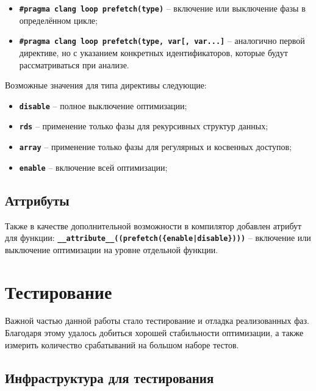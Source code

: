 \documentclass[12pt,a4paper,oneside]{article}
\begin{document}
\begin{itemize}
\item \texttt{\textbf{\#pragma clang loop prefetch(type)}} -- включение или выключение фазы в определённом цикле;
\item \texttt{\textbf{\#pragma clang loop prefetch(type, var[, var...]}} -- аналогично первой директиве, но с указанием конкретных идентификаторов, которые будут рассматриваться при анализе.
\end{itemize}

Возможные значения для типа директивы следующие:

\begin{itemize}
\item \texttt{\textbf{disable}} -- полное выключение оптимизации;
\item \texttt{\textbf{rds}} -- применение только фазы для рекурсивных структур данных;
\item \texttt{\textbf{array}} -- применение только фазы для регулярных и косвенных доступов;
\item \texttt{\textbf{enable}} -- включение всей оптимизации;
\end{itemize}

\subsection{Аттрибуты}

\indent

Также в качестве дополнительной возможности в компилятор добавлен атрибут для функции:\linebreak
\texttt{\textbf{\_\_attribute\_\_((prefetch(\{enable|disable\})))}} -- включение или выключение оптимизации на уровне отдельной функции.

\section{Тестирование}

Важной частью данной работы стало тестирование и отладка реализованных фаз. Благодаря этому удалось добиться хорошей стабильности оптимизации, а также измерить количество срабатываний на большом наборе тестов.

\subsection{Инфраструктура для тестирования}
\end{document}
